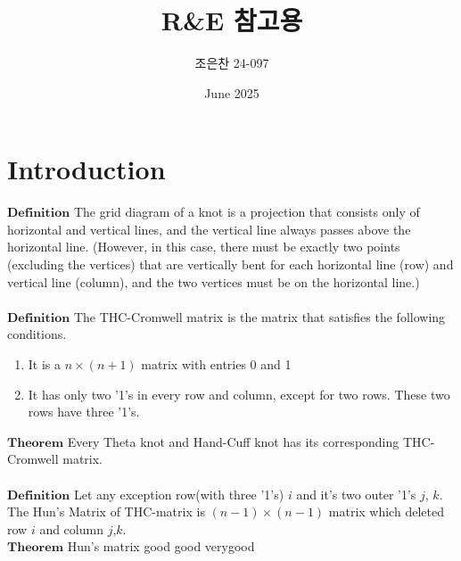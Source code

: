 \documentclass{article}
\title{R\&E 참고용}
\author{조은찬 24-097}
\date{June 2025}
\begin{document}
\maketitle

\section{Introduction}
$\mathbf{Definition}$ The grid diagram of a knot is a projection that consists only of horizontal and vertical lines, and the vertical line always passes above the horizontal line. (However, in this case, there must be exactly two points (excluding the vertices) that are vertically bent for each horizontal line (row) and vertical line (column), and the two vertices must be on the horizontal line.) \\ \\
$\mathbf{Definition}$ The THC-Cromwell matrix is the matrix that satisfies the following conditions.
\begin{enumerate}
    \item It is a $n\times(n+1)$ matrix with entries 0 and 1
    \item It has only two '1's in every row and column, except for two rows. These two rows have three '1's.
\end{enumerate}
$\mathbf{Theorem}$ Every Theta knot and Hand-Cuff knot has its corresponding THC-Cromwell matrix. \\ \\
$\mathbf{Definition}$ Let any exception row(with three '1's) $i$ and it's two outer '1's $j$, $k$. The Hun's Matrix of THC-matrix is $(n-1)\times(n-1)$ matrix which deleted row $i$ and column $j$,$k$.\\
$\mathbf{Theorem}$ 
Hun's matrix good good verygood
\end{document}
